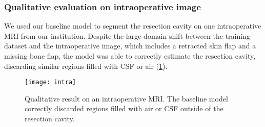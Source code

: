 \subsubsection{Qualitative evaluation on intraoperative image}

We used our baseline model to segment the resection cavity on one intraoperative \ac{MRI} from our institution.
Despite the large domain shift between the training dataset and the intraoperative image, which includes a retracted skin flap and a missing bone flap, the model was able to correctly estimate the resection cavity, discarding similar regions filled with \ac{CSF} or air (\cref{fig:intra}).

\begin{figure}
  \centering
  \texttt{[image: intra]}
  \caption[Qualitative result on an intraoperative \acs{MRI}]{
    Qualitative result on an intraoperative \ac{MRI}.
    The baseline model correctly discarded regions filled with air or \ac{CSF} outside of the resection cavity.
  }
  \label{fig:intra}
\end{figure}
